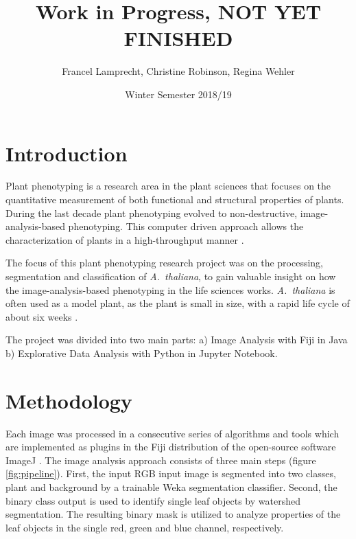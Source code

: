 \documentclass[paper=A4,bibliography=totocnumbered]{scrartcl}
\title{Work in Progress, NOT YET FINISHED}
\author{Francel Lamprecht, Christine Robinson, Regina Wehler}
\date{Winter Semester 2018/19}
\begin{document}
\maketitle

\tableofcontents
\clearpage
\section{Introduction}
Plant phenotyping is a research  area in the plant sciences that focuses on the quantitative measurement of both functional and structural properties of plants. During the last decade plant phenotyping evolved to non-destructive, image-analysis-based phenotyping. This computer driven approach allows the characterization of plants in a high-throughput manner \citep{Walter.2015}.

The focus of this plant phenotyping research project was on the processing, segmentation and classification of \textit{A.~thaliana}, to gain valuable insight on how the image-analysis-based phenotyping in the life sciences works. \textit{A.~thaliana} is often used as a model plant, as the plant is small in size, with a rapid life cycle of about six weeks \citep{Koornneef.2010}. 

The project was divided into two main parts:
a) Image Analysis with Fiji in Java
b) Explorative Data Analysis with Python in Jupyter Notebook.

\section{Methodology}
Each image was processed in a consecutive series of algorithms and tools which are implemented as plugins in the Fiji distribution \citep{Schindelin.2012} of the open-source software ImageJ \citep{Rueden.2017}. The image analysis approach consists of three main steps (figure \ref{fig:pipeline}). First, the input RGB input image is segmented into two classes, plant and background by a trainable Weka segmentation classifier. Second, the binary class output is used to identify single leaf objects by watershed segmentation. The resulting binary mask is utilized to analyze properties of the leaf objects in the single red, green and blue channel, respectively.
\end{document}
